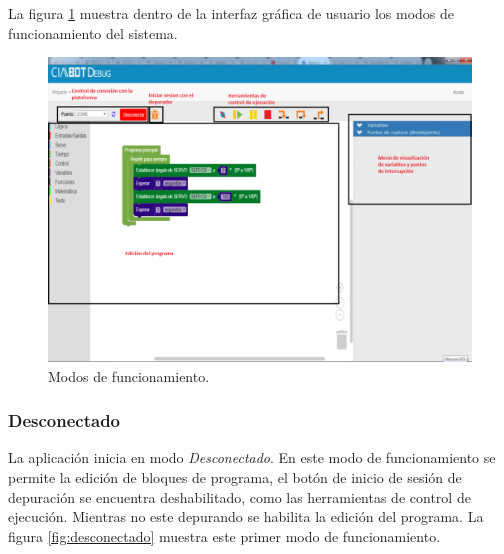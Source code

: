 La figura \ref{fig:debug-modos} muestra dentro de la interfaz gráfica de usuario los modos de funcionamiento del sistema.



\begin{figure}[!htbp]
	\begin{center}  %
		\includegraphics[scale=.35]{./Figures/debug-modos.png}
		\par\caption{Modos de funcionamiento.}\label{fig:debug-modos}
	\end{center}
\end{figure}


\subsubsection{Desconectado}
\label{subsubsec:No Conectado}

La aplicación inicia en modo \emph{Desconectado}. En este modo de funcionamiento se permite la edición de bloques de programa, el botón de inicio de sesión de depuración se encuentra deshabilitado, como las herramientas de control de ejecución. Mientras no este depurando se habilita la edición del programa. La figura \ref{fig:desconectado} muestra este primer modo de funcionamiento.


